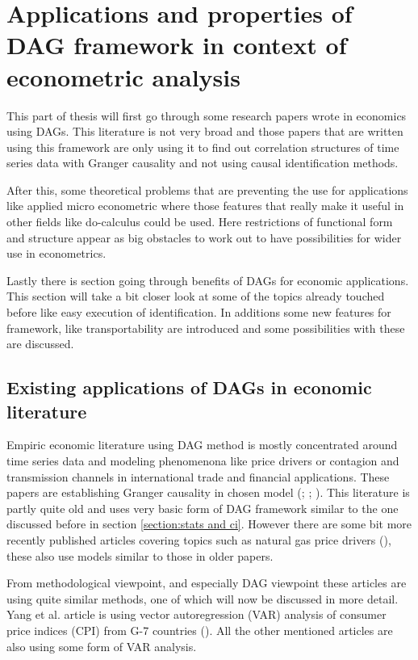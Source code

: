 \documentclass[main=english,12pt,a4paper,pdftex,econ,utf8]{aaltothesis}
\begin{document}
\clearpage

\section{Applications and properties of DAG framework in context of econometric analysis} \label{section:economics}

This part of thesis will first go through some research papers wrote in economics using DAGs. This literature is not very broad and those papers that are written using this framework are only using it to find out correlation structures of time series data with Granger causality and not using causal identification methods.

After this, some theoretical problems that are preventing the use for applications like applied micro econometric where those features that really make it useful in other fields like do-calculus could be used. Here restrictions of functional form and structure appear as big obstacles to work out to have possibilities for wider use in econometrics.

Lastly there is section going through benefits of DAGs for economic applications. This section will take a bit closer look at some of the topics already touched before like easy execution of identification. In additions some new features for framework, like transportability are introduced and some possibilities with these are discussed.

\subsection{Existing applications of DAGs in economic literature}

Empiric economic literature using DAG method is mostly concentrated around time series data and modeling phenomenona like price drivers or contagion and transmission channels in international trade and financial applications. These papers are establishing Granger causality in chosen model (\cite{Awokuse2003}; \cite{Bessler2003}; \cite{Yang2006}). This literature is partly quite old and uses very basic form of DAG framework similar to the one discussed before in section \ref{section:stats and ci}. However there are some bit more recently published articles covering topics such as natural gas price drivers (\cite{Ji2018}), these also use models similar to those in older papers.

From methodological viewpoint, and especially DAG viewpoint these articles are using quite similar methods, one of which will now be discussed in more detail. Yang et al. article is using vector autoregression (VAR) analysis of consumer price indices (CPI) from G-7 countries (\cite{Yang2006}). All the other mentioned articles are also using some form of VAR analysis. 
\end{document}
